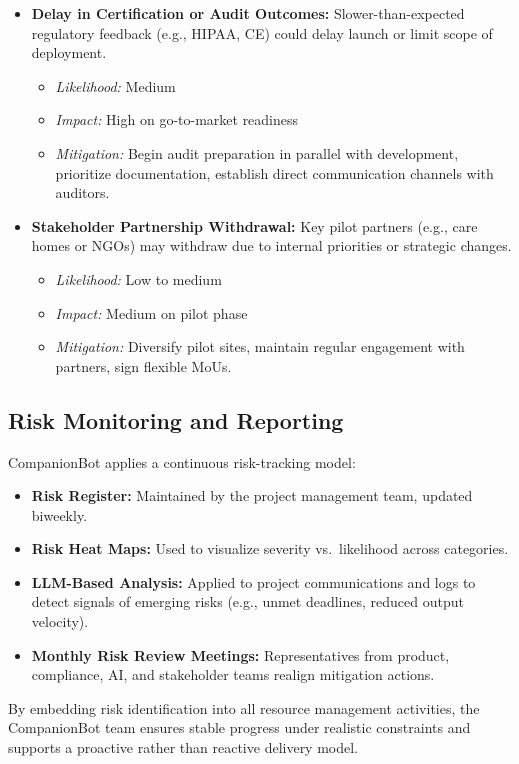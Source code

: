 \documentclass[
  letterpaper,
  DIV=11,
  numbers=noendperiod]{scrartcl}
\providecommand{\tightlist}{%
  \setlength{\itemsep}{0pt}\setlength{\parskip}{0pt}}\usepackage{longtable,booktabs,array}
\begin{document}
\begin{itemize}
\tightlist
\item
  \textbf{Delay in Certification or Audit Outcomes:}
  Slower-than-expected regulatory feedback (e.g., HIPAA, CE) could delay
  launch or limit scope of deployment.

  \begin{itemize}
  \tightlist
  \item
    \emph{Likelihood:} Medium
  \item
    \emph{Impact:} High on go-to-market readiness
  \item
    \emph{Mitigation:} Begin audit preparation in parallel with
    development, prioritize documentation, establish direct
    communication channels with auditors.
  \end{itemize}
\item
  \textbf{Stakeholder Partnership Withdrawal:} Key pilot partners (e.g.,
  care homes or NGOs) may withdraw due to internal priorities or
  strategic changes.

  \begin{itemize}
  \tightlist
  \item
    \emph{Likelihood:} Low to medium
  \item
    \emph{Impact:} Medium on pilot phase
  \item
    \emph{Mitigation:} Diversify pilot sites, maintain regular
    engagement with partners, sign flexible MoUs.
  \end{itemize}
\end{itemize}

\subsection{Risk Monitoring and
Reporting}\label{risk-monitoring-and-reporting}

CompanionBot applies a continuous risk-tracking model:

\begin{itemize}
\tightlist
\item
  \textbf{Risk Register:} Maintained by the project management team,
  updated biweekly.
\item
  \textbf{Risk Heat Maps:} Used to visualize severity vs.~likelihood
  across categories.
\item
  \textbf{LLM-Based Analysis:} Applied to project communications and
  logs to detect signals of emerging risks (e.g., unmet deadlines,
  reduced output velocity).
\item
  \textbf{Monthly Risk Review Meetings:} Representatives from product,
  compliance, AI, and stakeholder teams realign mitigation actions.
\end{itemize}

By embedding risk identification into all resource management
activities, the CompanionBot team ensures stable progress under
realistic constraints and supports a proactive rather than reactive
delivery model.
\end{document}
